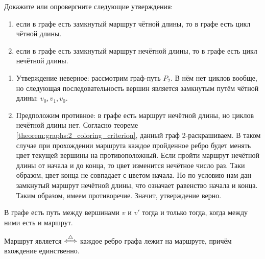 \begin{Exercise}[counter=SecExercise, label={exercise:graphs:walks_and_coloring}]
    \noindent
    Докажите или опровергните следующие утверждения:
    \begin{enumerate}[label=\textbf{\alph*)}]
        \item
            если в графе есть замкнутый маршрут чётной длины,
            то в графе есть цикл чётной длины.
        \item
            если в графе есть замкнутый маршрут нечётной длины,
            то в графе есть цикл нечётной длины.
    \end{enumerate}
\end{Exercise}

\begin{Answer}
    \noindent
    \begin{enumerate}[label=\textbf{\alph*)}]
        \item
            Утверждение неверное: рассмотрим граф-путь $ P_2 $.
            В нём нет циклов вообще, но следующая последовательность вершин является замкнутым путём чётной длины: $ v_0, v_1, v_0 $.
        \item
            Предположим противное: в графе есть маршрут нечётной длины, но циклов нечётной длины нет.
            Согласно теореме \ref{theorem:graphs:2_coloring_criterion}, данный граф 2-раскрашиваем.
            В таком случае при прохождении маршрута каждое пройденное ребро будет менять цвет текущей вершины на противоположный.
            Если пройти маршрут нечётной длины от начала и до конца, то цвет изменится нечётное число раз.
            Таки образом, цвет конца не совпадает с цветом начала.
            Но по условию нам дан замкнутый маршрут нечётной длины,
            что означает равенство начала и конца.
            Таким образом, имеем противоречие.
            Значит, утверждение верно.
    \end{enumerate}
\end{Answer}


\begin{statement}
    \label{statement:graphs:path_walk_equivalency}
    В графе есть путь между вершинами $ v $ и $ v' $ тогда и только тогда, когда между ними есть и маршрут.
\end{statement}

\begin{definition}
    Маршрут является  $ \overset{\triangle}{\Longleftrightarrow} $ каждое ребро графа лежит на маршруте, причём вхождение единственно.
\end{definition}

